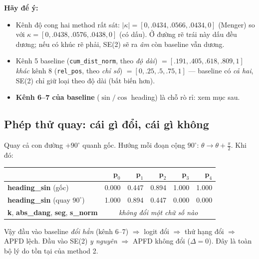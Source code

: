 \documentclass[11pt]{article}
\newcommand{\code}[1]{\textcolor{cInk}{\texttt{#1}}}
\newcommand{\kk}{\kappa}
\newcommand{\pt}{\mathbf{p}}
\theoremstyle{definition}
\newcommand{\chA}[1]{\textcolor{cA}{\textbf{#1}}}
\newcommand{\chB}[1]{\textcolor{cB}{\textbf{#1}}}
\begin{document}
\noindent\textbf{Hãy để ý:}
\begin{itemize}[leftmargin=1.4em]
\item Kênh độ cong hai method rất sát: $|\kk|=[0,.0434,.0566,.0434,0]$ (Menger)
so với $\kk=[0,.0438,.0576,.0438,0]$ (có dấu). Ở đường rẽ trái này dấu đều
dương; nếu có khúc rẽ phải, SE(2) sẽ ra \emph{âm} còn baseline vẫn dương.
\item Kênh 5 baseline (\code{cum\_dist\_norm}, theo \emph{độ dài}) $=[.191,.405,
.618,.809,1]$ \emph{khác} kênh 8 (\code{rel\_pos}, theo \emph{chỉ số})
$=[0,.25,.5,.75,1]$ --- baseline có \emph{cả hai}, SE(2) chỉ giữ loại theo độ
dài (bất biến hơn).
\item \textbf{Kênh 6--7 của baseline} ($\sin/\cos$ heading) là chỗ rò rỉ: xem
mục sau.
\end{itemize}

\subsection{Phép thử quay: cái gì đổi, cái gì không}
Quay cả con đường $+90^\circ$ quanh gốc. Hướng mỗi đoạn cộng $90^\circ$:
$\theta\to\theta+\tfrac\pi2$. Khi đó:
\begin{center}\small
\begin{tabular}{@{}l r r r r r@{}}
\toprule
& $\pt_0$ & $\pt_1$ & $\pt_2$ & $\pt_3$ & $\pt_4$\\
\midrule
\chA{heading\_sin} (gốc) & 0.000 & 0.447 & 0.894 & 1.000 & 1.000\\
\chA{heading\_sin} (quay $90^\circ$) & 1.000 & 0.894 & 0.447 & 0.000 & 0.000\\
\midrule
\chB{k}, \chB{abs\_dang}, \chB{seg}, \chB{s\_norm} & \multicolumn{5}{c}{\emph{không đổi một chữ số nào}}\\
\bottomrule
\end{tabular}
\end{center}
Vậy đầu vào baseline \emph{đổi hẳn} (kênh 6--7) $\Rightarrow$ logit đổi
$\Rightarrow$ thứ hạng đổi $\Rightarrow$ APFD lệch. Đầu vào SE(2) \emph{y
nguyên} $\Rightarrow$ APFD không đổi ($\Delta=0$). Đây là toàn bộ lý do tồn tại
của method 2.
\end{document}
